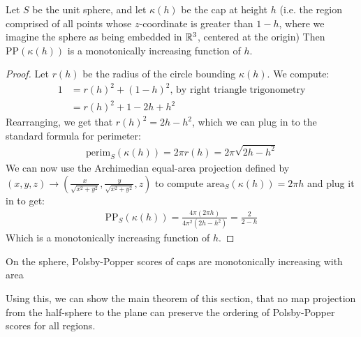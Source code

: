 \begin{lemma}\label{lem:ppscale}
  Let $S$ be the unit sphere, and let $\kappa(h)$ be the cap at height
  $h$ (i.e. the region comprised of all points whose $z$-coordinate is
  greater than $1-h$, where we imagine the sphere as being embedded in
  $\mathbb{R}^3$, centered at the origin) Then $\mathrm{PP}(\kappa(h))$ is
  a monotonically increasing function of $h$.
\end{lemma}


\begin{proof}
  Let $r(h)$ be the radius of the circle bounding $\kappa(h)$. We
  compute: 
  \begin{align*}
    1 &= r(h)^2 + (1-h)^2 \text {, by right triangle trigonometry}\\ 
      &= r(h)^2 + 1 - 2h+h^2
  \end{align*}
  Rearranging, we get that $r(h)^2= 2h-h^2$, which we can plug in to
  the standard formula for perimeter:
  \begin{align*}
    \mathrm{perim}_S(\kappa(h)) = 2\pi r(h) = 2\pi \sqrt{2h-h^2}
  \end{align*}
  We can now use the Archimedian equal-area projection 
  defined by $(x,y,z) \to
  \left(\frac{x}{\sqrt{x^2+y^2}},\frac{y}{\sqrt{x^2+y^2}}, z\right)$ 
  to compute $\mathrm{area}_S(\kappa(h)) = 2\pi h$ and plug it in to 
  get:
  \begin{align*}
    \mathrm{PP}_S(\kappa(h)) = \frac{4\pi (2\pi h) }{4 \pi^2 (2h-h^2)}
    = \frac{2}{2-h}
  \end{align*}
  Which is a monotonically increasing function of $h$.
\end{proof}
\begin{corollary}\label{cor:capscale}
  On the sphere, Polsby-Popper scores of caps are monotonically
  increasing with area
\end{corollary}
Using this, we can show the main theorem of this section, that no map
projection from the half-sphere to the plane can preserve the ordering
of Polsby-Popper scores for all regions.  

